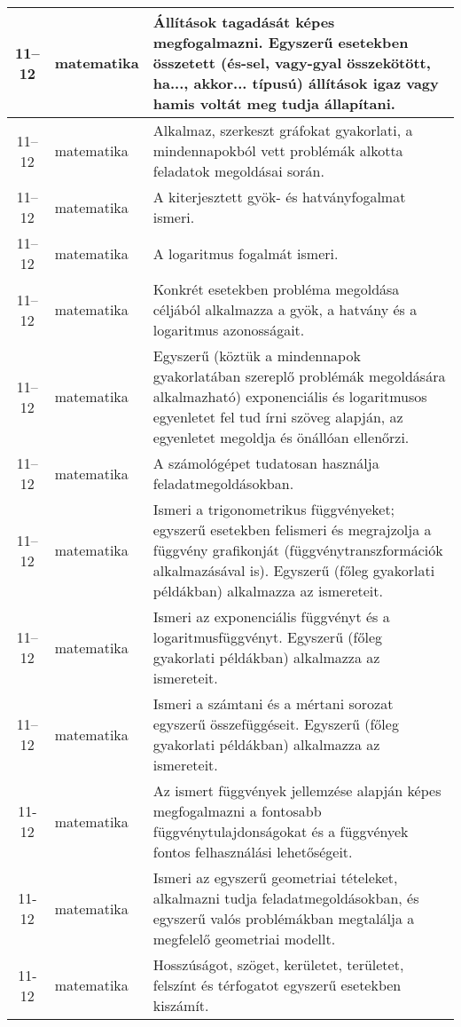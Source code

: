 \begin{small}
\begin{longtable}{c | p{2cm} |  p{11cm} }
              11--12 & matematika & Állítások tagadását képes megfogalmazni. Egyszerű esetekben összetett (és-sel, vagy-gyal összekötött, ha..., akkor... típusú) állítások igaz vagy hamis voltát meg tudja állapítani. \\ \hline
              11--12 & matematika & Alkalmaz, szerkeszt gráfokat gyakorlati, a mindennapokból vett problémák alkotta feladatok megoldásai során. \\ \hline
              11--12 & matematika & A kiterjesztett gyök- és hatványfogalmat ismeri. \\ \hline
              11--12 & matematika & A logaritmus fogalmát ismeri. \\ \hline
              11--12 & matematika & Konkrét esetekben probléma megoldása céljából  alkalmazza a gyök, a hatvány és a logaritmus azonosságait. \\ \hline
              11--12 & matematika & Egyszerű (köztük a mindennapok gyakorlatában szereplő problémák megoldására alkalmazható) exponenciális és logaritmusos egyenletet fel tud írni szöveg alapján, az egyenletet megoldja és önállóan ellenőrzi. \\ \hline
              11--12 & matematika & A számológépet tudatosan használja feladatmegoldásokban. \\ \hline
              11--12 & matematika & Ismeri a trigonometrikus függvényeket; egyszerű esetekben felismeri és megrajzolja a függvény grafikonját (függvénytranszformációk alkalmazásával is). Egyszerű (főleg gyakorlati példákban) alkalmazza az ismereteit. \\ \hline
              11--12 & matematika & Ismeri az exponenciális függvényt és a logaritmusfüggvényt. Egyszerű (főleg gyakorlati példákban) alkalmazza az ismereteit. \\ \hline
              11--12 & matematika & Ismeri a számtani és a mértani sorozat egyszerű összefüggéseit. Egyszerű (főleg gyakorlati példákban) alkalmazza az ismereteit. \\ \hline
              11-12 & matematika & Az ismert függvények jellemzése alapján képes megfogalmazni a fontosabb függvénytulajdonságokat és a függvények fontos felhasználási lehetőségeit. \\ \hline
              11-12 & matematika & Ismeri az egyszerű geometriai tételeket, alkalmazni tudja feladatmegoldásokban, és egyszerű valós problémákban megtalálja a megfelelő geometriai modellt. \\ \hline
              11-12 & matematika & Hosszúságot, szöget, kerületet, területet, felszínt és térfogatot egyszerű esetekben kiszámít. \\ \hline

\end{longtable}
\end{small}

